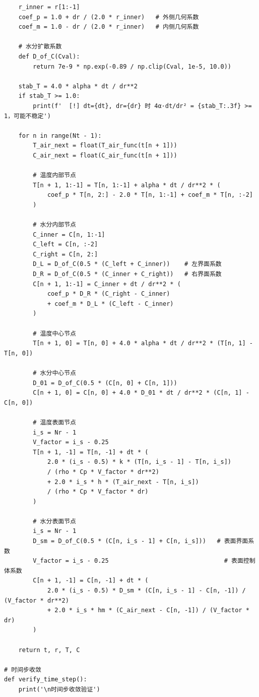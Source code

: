 \documentclass[withoutpreface,bwprint]{cumcm_thesis}
\begin{document}
\begin{appendices}
\begin{lstlisting}
    r_inner = r[1:-1]
    coef_p = 1.0 + dr / (2.0 * r_inner)   # 外侧几何系数
    coef_m = 1.0 - dr / (2.0 * r_inner)   # 内侧几何系数

    # 水分扩散系数
    def D_of_C(Cval):
        return 7e-9 * np.exp(-0.89 / np.clip(Cval, 1e-5, 10.0))

    stab_T = 4.0 * alpha * dt / dr**2
    if stab_T >= 1.0:
        print(f'  [!] dt={dt}, dr={dr} 时 4α·dt/dr² = {stab_T:.3f} >= 1，可能不稳定')

    for n in range(Nt - 1):
        T_air_next = float(T_air_func(t[n + 1]))
        C_air_next = float(C_air_func(t[n + 1]))

        # 温度内部节点
        T[n + 1, 1:-1] = T[n, 1:-1] + alpha * dt / dr**2 * (
            coef_p * T[n, 2:] - 2.0 * T[n, 1:-1] + coef_m * T[n, :-2]
        )

        # 水分内部节点
        C_inner = C[n, 1:-1]
        C_left = C[n, :-2]
        C_right = C[n, 2:]
        D_L = D_of_C(0.5 * (C_left + C_inner))    # 左界面系数
        D_R = D_of_C(0.5 * (C_inner + C_right))   # 右界面系数
        C[n + 1, 1:-1] = C_inner + dt / dr**2 * (
            coef_p * D_R * (C_right - C_inner)
            + coef_m * D_L * (C_left - C_inner)
        )

        # 温度中心节点
        T[n + 1, 0] = T[n, 0] + 4.0 * alpha * dt / dr**2 * (T[n, 1] - T[n, 0])

        # 水分中心节点
        D_01 = D_of_C(0.5 * (C[n, 0] + C[n, 1]))
        C[n + 1, 0] = C[n, 0] + 4.0 * D_01 * dt / dr**2 * (C[n, 1] - C[n, 0])

        # 温度表面节点
        i_s = Nr - 1
        V_factor = i_s - 0.25
        T[n + 1, -1] = T[n, -1] + dt * (
            2.0 * (i_s - 0.5) * k * (T[n, i_s - 1] - T[n, i_s])
            / (rho * Cp * V_factor * dr**2)
            + 2.0 * i_s * h * (T_air_next - T[n, i_s])
            / (rho * Cp * V_factor * dr)
        )

        # 水分表面节点
        i_s = Nr - 1
        D_sm = D_of_C(0.5 * (C[n, i_s - 1] + C[n, i_s]))   # 表面界面系数
        V_factor = i_s - 0.25                                # 表面控制体系数
        C[n + 1, -1] = C[n, -1] + dt * (
            2.0 * (i_s - 0.5) * D_sm * (C[n, i_s - 1] - C[n, -1]) / (V_factor * dr**2)
            + 2.0 * i_s * hm * (C_air_next - C[n, -1]) / (V_factor * dr)
        )

    return t, r, T, C

# 时间步收敛
def verify_time_step():
    print('\n时间步收敛验证')


\end{lstlisting}
\end{appendices}
\end{document}
